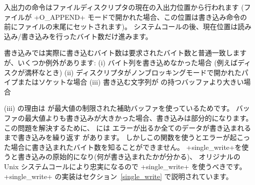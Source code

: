 入出力の命令はファイルディスクリプタの現在の入出力位置から行われます
(ファイルが \ml+O_APPEND+ モードで開かれた場合、この位置は書き込み命令の前にファイルの末尾にセットされます)。
システムコールの後、現在位置は読み込み/書き込みを行ったバイト数だけ進みます。


書き込みでは実際に書き込むバイト数は要求されたバイト数と普通一致しますが、いくつか例外があります:
(i) バイト列を書き込めなかった場合 (例えばディスクが満杯なとき)
(ii) ディスクリプタがノンブロッキングモードで開かれたパイプまたはソケットな場合
(iii) 書き込む文字列が \ocaml の持つバッファより大きい場合

(iii) の理由は \ocaml が最大値の制限された補助バッファを使っているためです。
バッファの最大値よりも書き込みが大きかった場合、書き込みは部分的になります。
この問題を解決するために、 \ocaml には エラーが出るか全てのデータが書き込まれるまで書き込みを繰り返す
 があります。
しかしこの関数を使うとエラーが起こった場合に書き込まれたバイト数を知ることができません。
\ml+single_write+を使うと書き込みの原始的になり(何が書き込まれたかが分かる)、
オリジナルの Unix システムコールにより忠実になるので \ml+single_write+ を使うべきです。
\ml+single_write+ の実装はセクション~\ref{single_write} で説明されています。

